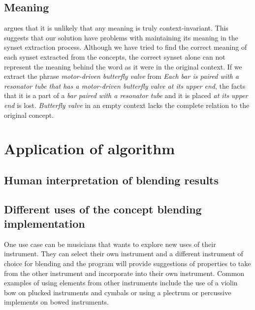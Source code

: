 \subsection{Meaning}
\parencite{Reference5} argues that it is unlikely that any meaning is truly context-invariant. This suggests that our solution have problems with maintaining its meaning in the synset extraction process. Although we have tried to find the correct meaning of each synset extracted from the concepts, the correct synset alone can not represent the meaning behind the word as it were in the original context. If we extract the phrase \emph{motor-driven butterfly valve} from \emph{Each bar is paired with a resonator tube that has a motor-driven butterfly valve at its upper end}, the facts that it is a part of a \emph{bar paired with a resonator tube} and it is placed \emph{at its upper end} is lost. \emph{Butterfly valve} in an empty context lacks the complete relation to the original concept.






\section{Application of algorithm}

\subsection{Human interpretation of blending results}


\subsection{Different uses of the concept blending implementation}
One use case can be musicians that wants to explore new uses of their instrument. They can select their own instrument and a different instrument of choice for blending and the program will provide suggestions of properties to take from the other instrument and incorporate into their own instrument. Common examples of using elements from other instruments include the use of a violin bow on plucked instruments and cymbals or using a plectrum or percussive implements on bowed instruments.

